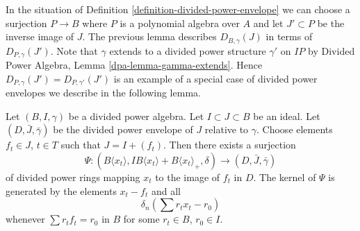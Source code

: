 \noindent
In the situation of Definition \ref{definition-divided-power-envelope}
we can choose a surjection $P \to B$ where $P$ is a polynomial
algebra over $A$ and let $J' \subset P$ be the inverse image of $J$.
The previous lemma describes $D_{B, \gamma}(J)$ in terms of
$D_{P, \gamma}(J')$. Note that $\gamma$ extends to a divided power
structure $\gamma'$ on $IP$ by
Divided Power Algebra, Lemma \ref{dpa-lemma-gamma-extends}. Hence
$D_{P, \gamma}(J') = D_{P, \gamma'}(J')$ is an example of a special
case of divided power envelopes we describe in the following lemma.

\begin{lemma}
\label{lemma-describe-divided-power-envelope}
Let $(B, I, \gamma)$ be a divided power algebra. Let $I \subset J \subset B$
be an ideal. Let $(D, \bar J, \bar \gamma)$ be the divided power envelope
of $J$ relative to $\gamma$. Choose elements $f_t \in J$, $t \in T$ such
that $J = I + (f_t)$. Then there exists a surjection
$$
\Psi :
(B\langle x_t \rangle, IB\langle x_t \rangle + B\langle x_t \rangle_+, \delta)
\longrightarrow
(D, \bar J, \bar \gamma)
$$
of divided power rings mapping $x_t$ to the image of $f_t$ in $D$.
The kernel of $\Psi$ is generated by the elements $x_t - f_t$ and
all
$$
\delta_n\left(\sum r_t x_t - r_0\right)
$$
whenever $\sum r_t f_t = r_0$ in $B$ for some $r_t \in B$, $r_0 \in I$.
\end{lemma}

